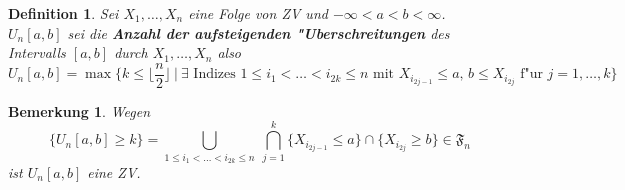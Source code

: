 \documentclass[a4paper,11pt]{scrbook}
\def\FF{ \mathfrak{F} }
\newtheorem{Def}{Definition}[chapter]
\newtheorem{Bem}{Bemerkung}[chapter]
\theoremstyle{nonumberplain}
\begin{document}
\begin{Def}
Sei $X_1,\dots,X_n$ eine Folge von ZV und $-\infty < a < b < \infty$.\\
$U_n[a,b]$ sei die \textbf{Anzahl der aufsteigenden "Uberschreitungen} des Intervalls $[a,b]$ durch $X_1,\dots,X_n$ also
\[
U_n[a,b] = \max\{ k \leq \lfloor \frac{n}2 \rfloor\ |\ \exists \text{ Indizes } 1 \leq i_1 < \dots < i_{2k} \leq n \text{ mit } X_{i_{2j-1}} \leq a,\, b \leq X_{i_{2j}} \text{ f"ur } j = 1,\dots,k \}
\]
\end{Def}

\begin{Bem}
Wegen
\[
\{U_n[a,b] \geq k\} = \bigcup_{1\leq i_1<\dots<i_{2k}\leq n} \ \bigcap_{j=1}^k \{ X_{i_{2j-1}} \leq a \} \cap \{X_{i_{2j}} \geq b\} \in \FF_n
\]
ist $U_n[a,b]$ eine ZV.
\end{Bem}
\end{document}
